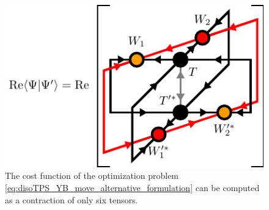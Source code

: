 \begin{figure}
	\centering
	\includegraphics[scale=1]{figures/tikz/disoTPS/yang_baxter_move_iterative/yang_baxter_move_iterative_a.pdf}
	\caption{The cost function of the optimization problem \eqref{eq:disoTPS_YB_move_alternative_formulation} can be computed as a contraction of only six tensors.}
	\label{fig:YB_move_iterate_polar_overlap}
\end{figure}
